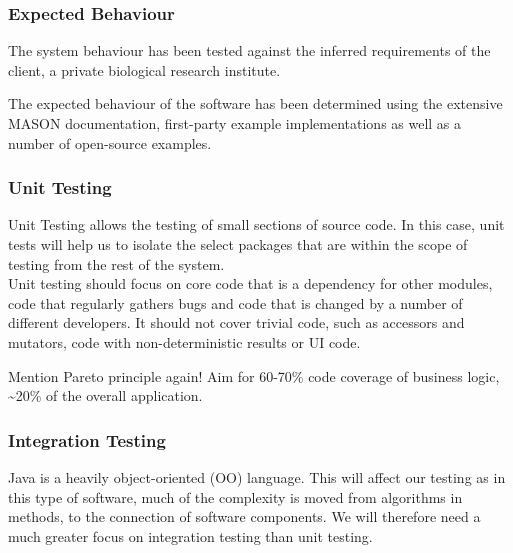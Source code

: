 \documentclass[11pt]{article}
\begin{document}
\subsubsection{Expected Behaviour}
The system behaviour has been tested against the inferred requirements of the client, a private biological research institute.

The expected behaviour of the software has been determined using the extensive MASON documentation\cite{mason_doc}, first-party example implementations as well as a number of open-source examples\cite{ppsim}.


\subsubsection{Unit Testing}
Unit Testing allows the testing of small sections of source code. In this case, unit tests will help us to isolate the select packages that are within the scope of testing from the rest of the system.
\\

Unit testing should focus on core code that is a dependency for other modules, code that regularly gathers bugs and code that is changed by a number of different developers. It should not cover trivial code, such as accessors and mutators, code with non-deterministic results or UI code.\cite{dont_test_blindly}

Mention Pareto principle again!
Aim for 60-70\% code coverage of business logic, %
\textasciitilde 20\% of the overall application.


\subsubsection{Integration Testing}

Java is a heavily object-oriented (OO) language. This will affect our testing as in this type of software, much of the complexity is moved from algorithms in methods, to the connection of software components\cite[pp.236]{introduction_book}. We will therefore need a much greater focus on integration testing than unit testing.
\end{document}
